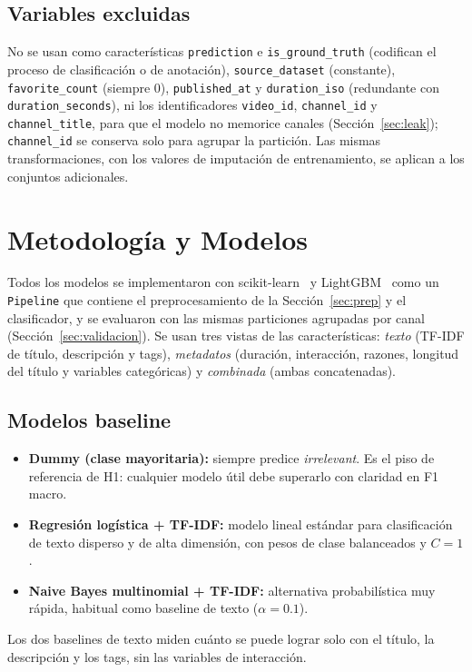 \documentclass[conference]{IEEEtran}
\begin{document}
\subsection{Variables excluidas}
No se usan como características \texttt{prediction} e \texttt{is\_ground\_truth} (codifican el proceso de clasificación o de anotación), \texttt{source\_dataset} (constante), \texttt{favorite\_count} (siempre 0), \texttt{published\_at} y \texttt{duration\_iso} (redundante con \texttt{duration\_seconds}), ni los identificadores \texttt{video\_id}, \texttt{channel\_id} y \texttt{channel\_title}, para que el modelo no memorice canales (Sección~\ref{sec:leak}); \texttt{channel\_id} se conserva solo para agrupar la partición. Las mismas transformaciones, con los valores de imputación de entrenamiento, se aplican a los conjuntos adicionales.

\section{Metodología y Modelos}\label{sec:metodologia}
Todos los modelos se implementaron con scikit-learn~\cite{sklearn} y LightGBM~\cite{lightgbm} como un \texttt{Pipeline} que contiene el preprocesamiento de la Sección~\ref{sec:prep} y el clasificador, y se evaluaron con las mismas particiones agrupadas por canal (Sección~\ref{sec:validacion}). Se usan tres vistas de las características: \textit{texto} (TF-IDF de título, descripción y tags), \textit{metadatos} (duración, interacción, razones, longitud del título y variables categóricas) y \textit{combinada} (ambas concatenadas).

\subsection{Modelos baseline}\label{sec:baseline}
\begin{itemize}
\item \textbf{Dummy (clase mayoritaria):} siempre predice \textit{irrelevant}. Es el piso de referencia de H1: cualquier modelo útil debe superarlo con claridad en F1 macro.
\item \textbf{Regresión logística + TF-IDF:} modelo lineal estándar para clasificación de texto disperso y de alta dimensión, con pesos de clase balanceados y $C=1$.
\item \textbf{Naive Bayes multinomial + TF-IDF:} alternativa probabilística muy rápida, habitual como baseline de texto ($\alpha=0.1$).
\end{itemize}
Los dos baselines de texto miden cuánto se puede lograr solo con el título, la descripción y los tags, sin las variables de interacción.
\end{document}
